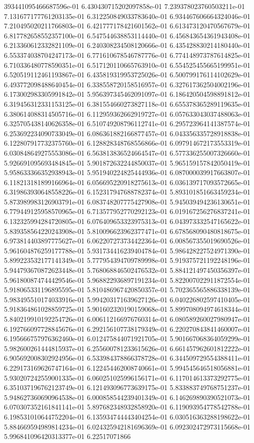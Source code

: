 393441095466687596e-01	6.430430715202097858e-01	7.239378023760503211e-01	7.131677177761203135e-01	6.312250849033783640e-01	6.934467606664324046e-01	7.210495020211766803e-01	6.421777178421601562e-01	6.613473120470567679e-01	6.817782658552357100e-01	6.547544638853114440e-01	6.456843654361943408e-01	6.213360612332821109e-01	6.240308234508120666e-01	6.435428830214180440e-01	6.553374038704247173e-01	6.771610678546787776e-01	6.774148973787614825e-01	6.710336480778590351e-01	6.517120110665763910e-01	6.554525455665199951e-01	6.520519112461193867e-01	6.435819319953725026e-01	6.500799176114102629e-01	6.493772098488640454e-01	6.338558720158516957e-01	6.327617362504002196e-01	6.173002983305991842e-01	5.956397345462091097e-01	6.186420504598891812e-01	6.319456312331153125e-01	6.381554660273827118e-01	6.655378365289119635e-01	6.380614088314505716e-01	6.112959362662919727e-01	6.057633043037488063e-01	6.325705438140626358e-01	6.510749208796112741e-01	6.295723964141387574e-01	6.253692234090733049e-01	6.086361882166877457e-01	6.043356335728918838e-01	6.122807917732375760e-01	6.128828348768556866e-01	6.097914672173553319e-01	6.030848649275553086e-01	6.563813836524664547e-01	6.577336255007326660e-01	5.926691095693484845e-01	5.901872632244850037e-01	5.965159157842050419e-01	5.958633366352938943e-01	5.951940224825444936e-01	6.087000039917663807e-01	6.118213181899166964e-01	6.056695220918275613e-01	6.036139717093572665e-01	6.319863930648558226e-01	6.152317947688782374e-01	5.893101851663459234e-01	5.873989983126903791e-01	6.083748207775427908e-01	5.945039494236130651e-01	6.779449125958570965e-01	6.713577952770292123e-01	6.019167256276837241e-01	6.132325994284720805e-01	6.076409653323975313e-01	6.043973332547165622e-01	5.839358564220243908e-01	5.810096623962377471e-01	6.678568090480818675e-01	6.973814403897775627e-01	6.062207273734422364e-01	6.008567355019690526e-01	5.961604876259177788e-01	5.931734416239404784e-01	5.986428227524971390e-01	5.899223532177141349e-01	5.777954394709789998e-01	5.919375721192248196e-01	5.944793670872623448e-01	5.768068846502476532e-01	5.884121497450356397e-01	5.961800874744429546e-01	5.968822936897191234e-01	5.822007022911872554e-01	5.918065331196895595e-01	5.810486967420850357e-01	5.702365565886338139e-01	5.983495510174033916e-01	5.994203171639627126e-01	6.040226802597410405e-01	5.918364861028859725e-01	5.901602320190159068e-01	5.899708094974618344e-01	5.840219910192254726e-01	6.006112166976760314e-01	6.080589260027980947e-01	6.192766097728845676e-01	6.292156107738179349e-01	6.220270843841460007e-01	6.195666757976362460e-01	6.012475844071921705e-01	5.901667068364059299e-01	5.982600261444815937e-01	6.255600781233615626e-01	6.661457962601812222e-01	6.905692008302924956e-01	6.533984378866378728e-01	6.344509729554388411e-01	6.229173169626747164e-01	6.122454462008740661e-01	5.994545646518056881e-01	5.930207242559001335e-01	6.060251025996156171e-01	6.117014613373292775e-01	6.351037196762123749e-01	6.121493096773639175e-01	5.833883749768751237e-01	5.948627360690964538e-01	6.000858544239401349e-01	6.146269890390521073e-01	6.070307352161841141e-01	5.897682348932858920e-01	6.119093954778542788e-01	6.198531010644752204e-01	6.135934744443404254e-01	6.030516363288198622e-01	5.884669594989814234e-01	6.024325942181696369e-01	6.092302472973115668e-01	5.996841096420313377e-01	6.22517071866